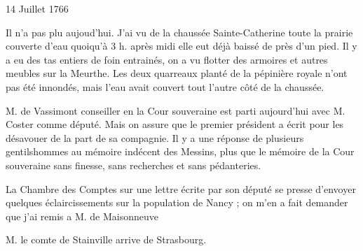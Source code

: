                      \begin{diary}{14 Juillet 1766}{}

                         Il n'a pas plu aujoud'hui. J'ai vu
                           de la chaussée
                              Sainte-Catherine toute la prairie couverte d'eau
                           quoiqu'à 3 h. après midi elle eut déjà baissé
                           de près d'un pied. Il y a eu des tas entiers de
                           foin entrainés, on a vu flotter des armoires
                           et autres meubles sur la
                              Meurthe. Les deux quarreaux
                           planté de la pépinière royale n'ont
                           pas été innondés, mais l'eau avait couvert
                           tout l'autre côté de la chaussée. \bigskip



                           M. de Vassimont
                           conseiller en la Cour souveraine est
                           parti aujourd'hui avec M. Coster
                           comme
                           député. Mais on assure que le
                              premier
                              président a écrit pour les désavouer de la
                           part de sa compagnie. Il y a une réponse
                           de plusieurs gentilshommes au mémoire
                              indécent des Messins, plus  que le
                              mémoire de la Cour souveraine sans finesse, sans
                           recherches et sans pédanteries. \bigskip



                           La Chambre des Comptes sur une lettre écrite par son
                           député se presse d'envoyer quelques éclaircissements
                           sur la population de Nancy ; on
                           m'en a
                           fait demander que j'ai remis a M. de
                              Maisonneuve
                        \bigskip



                           M. le comte de Stainville arrive
                           de Strasbourg. \bigskip


                     \end{diary}

